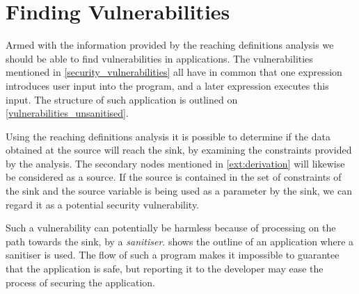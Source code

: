 \section{Finding Vulnerabilities}\label{theory_finding_vulns}
Armed with the information provided by the reaching definitions analysis we should be able to find vulnerabilities in applications.
The vulnerabilities mentioned in \cref{security_vulnerabilities} all have in common that one expression introduces user input into the program, and a later expression executes this input.
The structure of such application is outlined on \cref{vulnerabilities_unsanitised}.

Using the reaching definitions analysis it is possible to determine if the data obtained at the source will reach the sink, by examining the constraints provided by the analysis.
The secondary nodes mentioned in \cref{ext:derivation} will likewise be considered as a source.
If the source is contained in the set of constraints of the sink and the source variable is being used as a parameter by the sink, we can regard it as a potential security vulnerability.

Such a vulnerability can potentially be harmless because of processing on the path towards the sink, by a \emph{sanitiser}.
 shows the outline of an application where a sanitiser is used.
The flow of such a program makes it impossible to guarantee that the application is safe, but reporting it to the developer may ease the process of securing the application.

